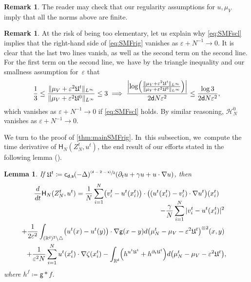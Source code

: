 \documentclass[10pt]{amsart}
\newcommand{\psfrac}[2]{\sfrac{(#1)}{#2}}
\theoremstyle{plain}
\newtheorem{lemma}[thm]{Lemma}
\theoremstyle{definition}
\newtheorem{remark}[thm]{Remark}
\DeclarePairedDelimiter{\pa}{\lparen}{\rparen}
\let\div\relax
\DeclareMathOperator{\div}{\mathrm{div}}
\newcommand{\R}{{\mathbb{R}}}
\let\ga\gamma
\let\D\Delta
\let\vep\varepsilon
\let\p\partial
\let\uz Z
\newcommand{\Uu}{\mathfrak{U}}
\newcommand{\Hr}{\mathsf{H}}
\renewcommand{\d}{\mathsf{d}}
\newcommand{\g}{{\mathsf{g}}}
\newcommand{\s}{\mathsf{s}}
\newcommand{\cd}{\mathsf{c}_{\mathsf{d},\mathsf{s}}}
\begin{document}
\begin{remark}
The reader may check that our regularity assumptions for $u,\mu_V$ imply that all the norms above are finite.
\end{remark}

\begin{remark}
At the risk of being too elementary, let us explain why \eqref{eq:SMFscl} implies that the right-hand side of \eqref{eq:SMFrig} vanishes as $\vep+N^{-1}\to 0$. It is clear that the last two lines vanish, as well as the second term on the second line. For the first term on the second line, we~have by the triangle inequality and our smallness assumption for~$\vep$ that
\begin{equation*}
\frac{1}{3}\leq \frac{\|\mu_V+\vep^2\Uu^t\|_{L^\infty}}{\|\mu_V+\vep^2\Uu^0\|_{L^\infty}} \leq 3 \implies \frac{\left|\log\pa*{\frac{\|\mu_V+\vep^2\Uu^t\|_{L^\infty}}{\|\mu_V+\vep^2\Uu^0\|_{L^\infty}}}\right|}{2\d N\vep^2} \leq \frac{\log 3}{2\d N\vep^2},
\end{equation*}
which vanishes as $\vep+N^{-1}\to 0$ if \eqref{eq:SMFscl} holds. By similar reasoning, $\mathscr{H}_{N}^0$ vanishes as $\vep+N^{-1}\to 0$.
\end{remark}

\label{ssec:MPcomp}
We turn to the proof of \cref{thm:mainSMFrig}. In~this subsection, we~compute the time derivative of $\Hr_{N}(\uz_N^t,u^t)$, the end result of our efforts stated in the following lemma (\cf \cite[Eq.\,(2.7)]{HkI2021}).

\begin{lemma}\label{lem:MEsmfID}
If $\Uu^t \coloneqq \cd(-\D)^{\psfrac{\d-2-\s}{2}}\div(\p_t u + \gamma u + u\cdot\nabla u)$, then
\begin{multline}\label{eq:dtHNid}
\frac{d}{dt}\Hr_{N}(\uz_N^t,u^t) = \frac{1}{N}\sum_{i=1}^N \pa*{v_i^t - u^t(x_i^t)}\cdot \pa*{(u^t(x_i^t)- v_i^t)\cdot\nabla u^t}(x_i^t)\\[-10pt]
\shoveright{-\frac{\ga}{N}\sum_{i=1}^N |v_i^t-u^t(x_i^t)|^2}\\
\shoveright{+\frac{1}{2\vep^2}\int_{(\R^\d)^2\setminus\triangle} \pa*{u^t(x)-u^t(y)}\cdot\nabla\g(x-y)d\pa*{\mu_N^t-\mu_V-\vep^2\Uu^t}^{\otimes 2}(x,y)} \\
+\frac{1}{\vep^2N}\sum_{i=1}^N u^t(x_i^t)\cdot \nabla\zeta(x_i^t)-\int_{\R^\d}\pa*{\div h^{u^t\Uu^t}+h^{\p_t\Uu^t}}d\pa*{\mu_N^t-\mu_V-\vep^2\Uu^t},
\end{multline}
where $h^f\coloneqq \g\ast f$.
\end{lemma}
\end{document}
